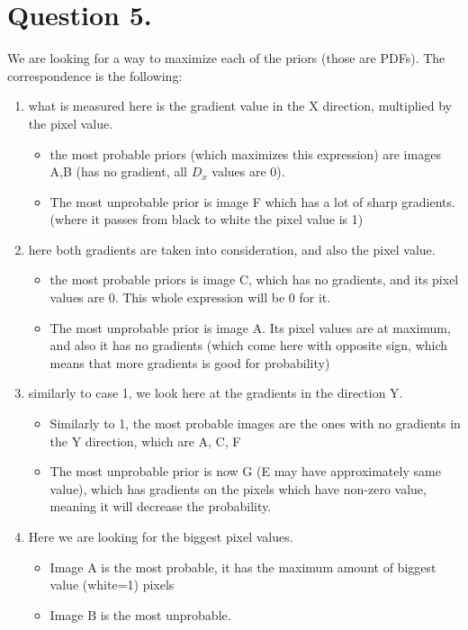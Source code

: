 \documentclass[a4paper]{iacas}
\begin{document}
\newpage
\section{Question 5.}
We are looking for a way to maximize each of the priors (those are PDFs).
\newline
The correspondence is the following:
\begin{enumerate}
\item what is measured here is the gradient value in the X direction, multiplied by the pixel value. 
	\begin{itemize}
	\item the most probable priors (which maximizes this expression) are images A,B (has no gradient, all $D_x$ values are 0). 
	\item The most unprobable prior is image F which has a lot of sharp gradients. (where it passes from black to white the pixel value is 1)
	\end{itemize}
\item here both gradients are taken into consideration, and also the pixel value.
	\begin{itemize}
	\item the most probable priors is image C, which has no gradients, and its pixel values are 0. This whole expression will be 0 for it.
	\item The most unprobable prior is image A. Its pixel values are at maximum, and also it has no gradients (which come here with opposite sign, which means that more gradients is good for probability)
	\end{itemize}
\item similarly to case 1, we look here at the gradients in the direction Y.
	\begin{itemize}
	\item Similarly to 1, the most probable images are the ones with no gradients in the Y direction, which are A, C, F
	\item The most unprobable prior is now G (E may have approximately same value), which has gradients on the pixels which have non-zero value, meaning it will decrease the probability.
	\end{itemize}
\item Here we are looking for the biggest pixel values.
	\begin{itemize}
	\item Image A is the most probable, it has the maximum amount of biggest value (white=1) pixels
	\item Image B is the most unprobable.
	\end{itemize}
\end{enumerate}






\end{document}
